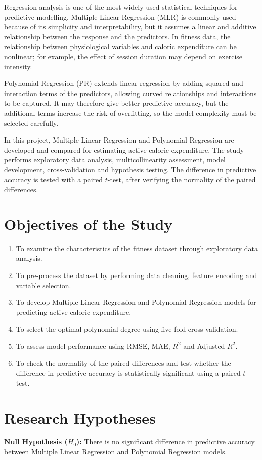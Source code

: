 \documentclass[12pt,a4paper]{report}
\begin{document}
Regression analysis is one of the most widely used statistical techniques for predictive modelling. Multiple Linear Regression (MLR) is commonly used because of its simplicity and interpretability, but it assumes a linear and additive relationship between the response and the predictors. In fitness data, the relationship between physiological variables and caloric expenditure can be nonlinear; for example, the effect of session duration may depend on exercise intensity.

Polynomial Regression (PR) extends linear regression by adding squared and interaction terms of the predictors, allowing curved relationships and interactions to be captured. It may therefore give better predictive accuracy, but the additional terms increase the risk of overfitting, so the model complexity must be selected carefully.

In this project, Multiple Linear Regression and Polynomial Regression are developed and compared for estimating active caloric expenditure. The study performs exploratory data analysis, multicollinearity assessment, model development, cross-validation and hypothesis testing. The difference in predictive accuracy is tested with a paired $t$-test, after verifying the normality of the paired differences.

\section{Objectives of the Study}
\begin{enumerate}[itemsep=2pt]
\item To examine the characteristics of the fitness dataset through exploratory data analysis.
\item To pre-process the dataset by performing data cleaning, feature encoding and variable selection.
\item To develop Multiple Linear Regression and Polynomial Regression models for predicting active caloric expenditure.
\item To select the optimal polynomial degree using five-fold cross-validation.
\item To assess model performance using RMSE, MAE, $R^2$ and Adjusted $R^2$.
\item To check the normality of the paired differences and test whether the difference in predictive accuracy is statistically significant using a paired $t$-test.
\end{enumerate}

\section{Research Hypotheses}
\textbf{Null Hypothesis ($H_0$):} There is no significant difference in predictive accuracy between Multiple Linear Regression and Polynomial Regression models.
\end{document}
